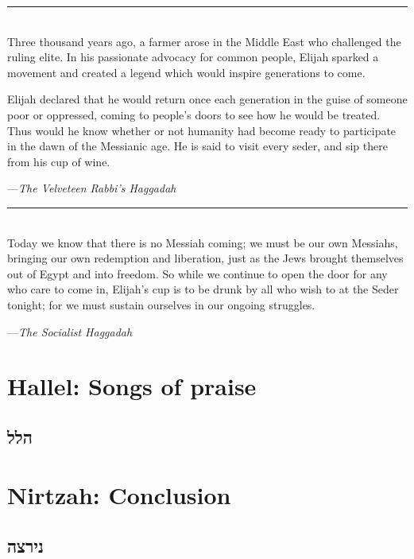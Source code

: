 \documentclass[a4paper,10pt,openany]{memoir}
\newcommand{\HgSource}[1]{\hfill{\small---\itshape{#1}}}
\newcommand{\hchapter}[1]{
  \begin{otherlanguage}{hebrew}
    \chapter*{#1}
  \end{otherlanguage}
}
\newcommand{\HgFill}{\vfill \hrule \vfill}
\newenvironment{HgEnglish}{\strut\\\noindent}{\vspace{1em}}
\begin{document}
\HgFill

\begin{HgEnglish}
Three thousand years ago, a farmer arose in the Middle East who challenged the
ruling elite. In his passionate advocacy for common people, Elijah sparked a
movement and created a legend which would inspire generations to come.

Elijah declared that he would return once each generation in the guise of
someone poor or oppressed, coming to people's doors to see how he would be
treated. Thus would he know whether or not humanity had become ready to
participate in the dawn of the Messianic age. He is said to visit every seder,
and sip there from his cup of wine.

\HgSource{The Velveteen Rabbi's Haggadah}
\end{HgEnglish}


\HgFill

\begin{HgEnglish}
  Today we know that there is no Messiah coming; we must be our own Messiahs,
  bringing our own redemption and liberation, just as the Jews brought
  themselves out of Egypt and into freedom. So while we continue to open the
  door for any who care to come in, Elijah’s cup is to be drunk by all who wish
  to at the Seder tonight; for we must sustain ourselves in our ongoing
  struggles.

  \HgSource{The Socialist Haggadah}
\end{HgEnglish}


\chapter{Hallel: Songs of praise}
\hchapter{הלל}
\chapter{Nirtzah: Conclusion}
\hchapter{נירצה}
\end{document}

